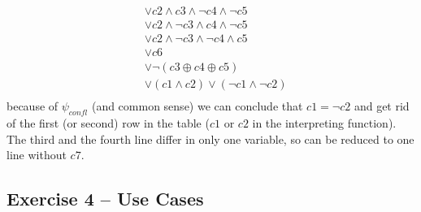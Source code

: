 \documentclass{scrartcl}
\begin{document}
\begin{itemize}
\begin{align*}
	&\lor c2 \land c3 \land ¬c4 \land ¬c5 \\
	&\lor c2 \land ¬c3 \land c4 \land ¬c5 \\
	&\lor c2 \land ¬c3 \land ¬c4 \land c5 \\
	&\lor c6\\
	&\lor ¬(c3 \oplus c4 \oplus c5)\\
	&\lor (c1 \land c2 )\lor(¬c1 \land ¬c2)\\
	\end{align*}
	because of $\psi_{confl}$ (and common sense) we can conclude that $c1 = ¬c2$ and get rid of the first (or second) row in the table ($c1$ or $c2$ in the interpreting function). The third and the fourth line differ in only one variable, so can be reduced to one line without $c7$.\\
\end{itemize}

\subsection*{Exercise 4 – Use Cases}
\end{document}
